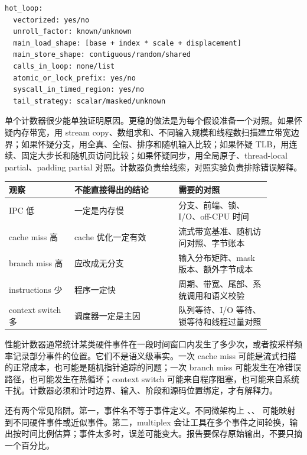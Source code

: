 \begin{lstlisting}[numbers=none,caption={计数器报告的反汇编摘要字段}]
hot_loop:
  vectorized: yes/no
  unroll_factor: known/unknown
  main_load_shape: [base + index * scale + displacement]
  main_store_shape: contiguous/random/shared
  calls_in_loop: none/list
  atomic_or_lock_prefix: yes/no
  syscall_in_timed_region: yes/no
  tail_strategy: scalar/masked/unknown
\end{lstlisting}

单个计数器很少能单独证明原因。更稳的做法是为每个假设准备一个对照。如果怀疑内存带宽，用 stream copy、数组求和、不同输入规模和线程数扫描建立带宽边界；如果怀疑分支，用全真、全假、排序和随机输入比较；如果怀疑 TLB，用连续、固定大步长和随机页访问比较；如果怀疑同步，用全局原子、thread-local partial、padding partial 对照。计数器负责给线索，对照实验负责排除错误解释。

\begin{center}
\small
\begin{tabular}{@{}p{0.22\linewidth}p{0.35\linewidth}p{0.31\linewidth}@{}}
\toprule
观察 & 不能直接得出的结论 & 需要的对照 \\
\midrule
IPC 低 & 一定是内存慢 & 分支、前端、锁、I/O、off-CPU 时间 \\
cache miss 高 & cache 优化一定有效 & 流式带宽基准、随机访问对照、字节账本 \\
branch miss 高 & 应改成无分支 & 输入分布矩阵、mask 版本、额外字节成本 \\
instructions 少 & 程序一定快 & 周期、带宽、尾部、系统调用和语义校验 \\
context switch 多 & 调度器一定是主因 & 队列等待、I/O 等待、锁等待和线程过量对照 \\
\bottomrule
\end{tabular}
\end{center}

性能计数器通常统计某类硬件事件在一段时间窗口内发生了多少次，或者按采样频率记录部分事件的位置。它们不是语义级事实。一次 cache miss 可能是流式扫描的正常成本，也可能是随机指针追踪的问题；一次 branch miss 可能发生在冷错误路径，也可能发生在热循环；context switch 可能来自程序阻塞，也可能来自系统干扰。计数器必须和计时边界、输入、阶段和源码位置绑定，才有解释力。

还有两个常见陷阱。第一，事件名不等于事件定义。不同微架构上 、、 可能映射到不同硬件事件或近似事件。第二，multiplex 会让工具在多个事件之间轮换，输出按时间比例估算；事件太多时，误差可能变大。报告要保存原始输出，不要只摘一个百分比。


